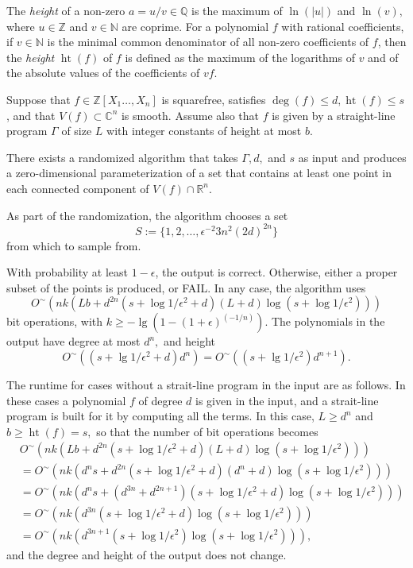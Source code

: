 \documentclass[sigconf]{acmart}
\DeclareMathOperator{\htt}{ht}
\def\C{\mathbb{C}}
\def\Q{\mathbb{Q}}
\def\R{\mathbb{R}}
\newcommand{\ZZ}{{\mathbb{Z}}}
\begin{document}
The {\em height} of a non-zero $a=u/v \in \Q$ is the maximum of
$\ln(|u|)$ and $\ln(v),$ where $u \in \mathbb{Z}$ and $v \in
\mathbb{N}$ are coprime. For a polynomial $f$ with rational
coefficients, if $v \in \mathbb N$ is the minimal common denominator
of all non-zero coefficients of $f$, then the \textit{height}
$\htt(f)$ of $f$ is defined as the maximum of the logarithms of $v$
and of the absolute values of the coefficients of $vf$.

\begin{theorem}\label{theo:main}
  Suppose that $f\in\ZZ[X_1\hdots,X_n]$ is squarefree, satisfies
  $\deg(f) \leq d, \htt(f) \leq s$, and that $V(f) \subset \C^n$ is
  smooth.  Assume also that $f$ is given by a straight-line program
  $\Gamma$ of size $L$ with integer constants of height at most $b.$

  There exists a randomized algorithm that takes $\Gamma, d,$ and $s$
  as input and produces a zero-dimensional parameterization of a set
  that contains at least one point in each connected component of
  $V(f) \cap \R^n$. 
  
  As part of the randomization, the algorithm chooses a set 
  \[
  S := \{1,2,\hdots,\epsilon^{-2}3n^2(2d)^{2n}\}
  \]
  from which to sample from. 
  
  With probability at least $1-\epsilon$, the output is correct. Otherwise, either a proper subset of the points is produced, or FAIL.  In any case, the algorithm uses
  \[
  O^{\sim}(nk(Lb+d^{2n}(s + \log 1/\epsilon^2+d)(L+d)\log(s + \log 1/\epsilon^2)))
  \]
  bit operations, with $k \geq -\lg(1-(1+\epsilon)^{(-1/n)})$. The polynomials in
  the output have degree at most $d^n,$ and height 
  \[
  O^{\sim}((s+\lg 1/\epsilon^2 + d)d^n)
  =O^{\sim}((s+\lg 1/\epsilon^2)d^{n+1}).
  \]
\end{theorem}

The runtime for cases without a strait-line program in the input are as follows. In these cases a polynomial $f$ of degree $d$ is given in the input, and a strait-line program is built for it by computing all the terms. In this case, $L \geq d^n$ and $b \geq \htt(f) = s,$ so that the number of bit operations becomes
\begin{align*}
      &O^{\sim}(nk(Lb+d^{2n}(s + \log 1/\epsilon^2+d)(L+d)\log(s + \log 1/\epsilon^2)))\\
      &= 
O^{\sim}(nk(d^ns+d^{2n}(s + \log 1/\epsilon^2+d)(d^n+d)\log(s + \log 1/\epsilon^2)))\\
      &= 
O^{\sim}(nk(d^ns+(d^{3n}+d^{2n+1})(s + \log 1/\epsilon^2+d)\log(s + \log 1/\epsilon^2)))\\
     &= 
O^{\sim}(nk(d^{3n}(s + \log 1/\epsilon^2+d)\log(s + \log 1/\epsilon^2)))\\
     &= 
O^{\sim}(nk(d^{3n+1}(s + \log 1/\epsilon^2)\log(s + \log 1/\epsilon^2))),
\end{align*}
and the degree and height of the output does not change.
\end{document}
